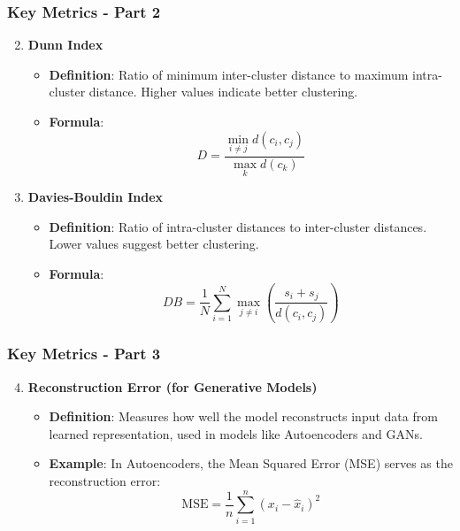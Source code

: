 \documentclass[aspectratio=169]{beamer}
\begin{document}
\begin{frame}[fragile]
    \frametitle{Key Metrics - Part 2}
    \begin{enumerate}
        \setcounter{enumi}{1}
        \item \textbf{Dunn Index}
            \begin{itemize}
                \item \textbf{Definition}: Ratio of minimum inter-cluster distance to maximum intra-cluster distance. Higher values indicate better clustering.
                \item \textbf{Formula}:
                \begin{equation}
                    D = \frac{\min_{i \neq j} d(c_i, c_j)}{\max_{k} d(c_k)}
                \end{equation}
            \end{itemize}

        \item \textbf{Davies-Bouldin Index}
            \begin{itemize}
                \item \textbf{Definition}: Ratio of intra-cluster distances to inter-cluster distances. Lower values suggest better clustering.
                \item \textbf{Formula}:
                \begin{equation}
                    DB = \frac{1}{N} \sum_{i=1}^{N} \max_{j \neq i} \left( \frac{s_i + s_j}{d(c_i, c_j)} \right)
                \end{equation}
            \end{itemize}
    \end{enumerate}
\end{frame}

\begin{frame}[fragile]
    \frametitle{Key Metrics - Part 3}
    \begin{enumerate}
        \setcounter{enumi}{3}
        \item \textbf{Reconstruction Error (for Generative Models)}
            \begin{itemize}
                \item \textbf{Definition}: Measures how well the model reconstructs input data from learned representation, used in models like Autoencoders and GANs.
                \item \textbf{Example}: In Autoencoders, the Mean Squared Error (MSE) serves as the reconstruction error:
                \begin{equation}
                    \text{MSE} = \frac{1}{n} \sum_{i=1}^n (x_i - \hat{x}_i)^2
                \end{equation}
            \end{itemize}
    \end{enumerate}
\end{frame}
\end{document}
